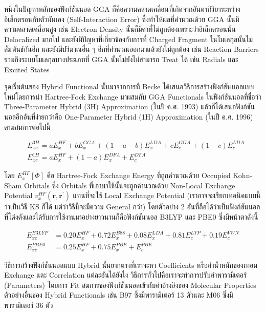 หนึ่งในปัญหาหลักของฟังก์ชันนอล GGA ก็คือความคลาดเคลื่อนที่เกิดจากอันตรกิริยาระหว่างอิเล็กตรอนกับตัวมันเอง (Self-Interaction Error)
ซึ่งทำให้ผลที่คำนวณด้วย GGA นั้นมีความคลาดเคลื่อนสูง เช่น Electron Density นั้นก็มีค่าที่ไม่ถูกต้องเพราะว่าอิเล็กตรอนนั้น Delocalized มากไป
และยังมีปัญหาที่เกี่ยวข้องกับการที่ Charged Fragment ในโมเลกุลนั้นไม่สัมพันธ์กันอีก และยังมีปริมาณอื่น ๆ อีกที่คำนวณออกมาแล้วยังไม่ถูกต้อง เช่น
Reaction Barriers รวมถึงระบบโมเลกุลบางประเภทที่ GGA นั้นไม่ยังไม่สามารถ Treat ได้ เช่น Radials และ Excited States

จุดเริ่มต้นของ Hybrid Functional นั้นมาจากการที่ Becke ได้เสนอวิธีการสร้างฟังก์ชันนอลแบบใหม่โดยการนำ Hartree-Fock Exchange
มาผสมกับ GGA Functionals ในฟังก์ชันนอลที่ชื่อว่า Three-Parameter Hybrid (3H) Approximation (ในปี ค.ศ. 1993)
แล้วก็ได้เสนอฟังก์ชันนอลอีกอันที่ง่ายกว่าคือ One-Parameter Hybrid (1H) Approximation (ในปี ค.ศ. 1996) ตามสมการต่อไปนี้

\begin{align}
   & E_{xc}^{3 H}
  =
  a E_x^{HF}+b E_x^{G G A}+(1-a-b) E_x^{LDA}+c E_c^{GGA}+(1-c) E_c^{LDA} \\
   & E_{xc}^{1 H}
  =
  a E_x^{HF}+(1-a) E_x^{D F A}+E_c^{DFA}
\end{align}

\noindent โดย $E_x^{H F}[\Phi]$ คือ Hartree-Fock Exchange Energy ที่ถูกคำนวณด้วย Occupied Kohn-Sham Orbitals
ซึ่ง Orbitals ที่เอามาใช้นั้นจะถูกคำนวณด้วย Non-Local Exchange Potential $v_x^{H F}\left(\mathbf{r}, \mathbf{r}^{\prime}\right)$
แทนที่จะใช้ Local Exchange Potential (เราอาจจะเรียกเทคนิคแบบนี้ว่าเป็นวิธี KS ก็ได้ แต่ว่าวิธีนี้จะมีความ General กว่า)
โดยตัวอย่าง 2 อันที่ถือได้ว่าเป็นฟังก์ชันนอลที่โด่งดังและได้รับการใช้งานมาอย่างยาวนานก็คือฟังก์ชันนอล B3LYP และ PBE0 ซึ่งมีหน้าตาดังนี้

\begin{align}
  E_{x c}^{B3LYP}
   & =
  0.20 E_x^{HF}+0.72 E_x^{B 88}+0.08 E_x^{LDA}+0.81 E_c^{LYP}+0.19 E_c^{VWN} \\
  E_{x c}^{PBE0}
   & =
  0.25 E_x^{HF}+0.75 E_x^{PBE}+E_c^{PBE}
\end{align}

วิธีการสร้างฟังก์ชันนอลแบบ Hybrid นั้นยากตรงที่เราจะหา Coefficients หรือค่าน้ำหนักของเทอม Exchange และ Correlation แต่ละอันได้ยังไง
วิธีการทั่วไปคือเราจะทำการปรับค่าพารามิเตอร์ (Parameters) โดยการ Fit สมการของฟังก์ชันนอลเข้ากับค่าอ้างอิงของ Molecular Properties
ตัวอย่างอื่นของ Hybrid Functionals เช่น B97 ซึ่งมีพารามิเตอร์ 13 ตัวและ M06 ซึ่งมีพารามิเตอร์ 36 ตัว


